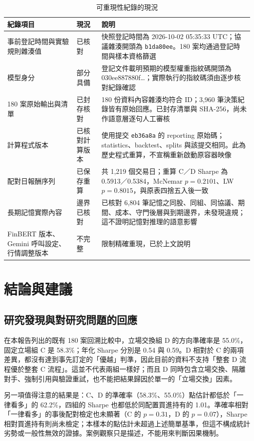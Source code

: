\documentclass[12pt,a4paper]{article}
\numberwithin{table}{section}
\numberwithin{figure}{section}
\begin{document}
\begin{table}[H]
\centering\small
\caption{可重現性紀錄的現況}
\label{tab:prov}
\begin{tabularx}{\textwidth}{@{}L{.25} L{.15} Y@{}}
\toprule
紀錄項目 & 現況 & 說明 \\
\midrule
事前登記時間與實驗規則雜湊值 & 已核對 & 快照登記時間為 2026-10-02 05:35:33 UTC；協議雜湊開頭為 \texttt{b1da80ee}。180 案均通過登記時間與樣本資格篩選 \\
模型身分 & 部分具備 & 登記文件載明預期的模型權重指紋碼開頭為 030ee887880f…；實際執行的指紋碼須由逐步核對紀錄確認 \\
180 案原始輸出與清單 & 已封存核對 & 180 份資料內容雜湊均符合 ID；3,960 筆決策紀錄皆有原始回應。已封存清單與 SHA-256，尚未作語意層逐句人工審核 \\
計算程式版本 & 已核對計算版本 & 使用提交 \texttt{eb36a8a} 的 reporting 原始碼；statistics、backtest、splits 與該提交相同。此為歷史程式重算，不宣稱重新啟動原容器映像 \\
配對日報酬序列 & 已保存重算 & 共 1,219 個交易日；重算 C／D Sharpe 為 0.5913／0.5384，McNemar $p=0.2101$、LW $p=0.8015$，與原表四捨五入後一致 \\
長期記憶實際內容 & 邊界已核對 & 已核對 6,804 筆記憶之同股、同組、同協議、期間、成本、守門後層與到期邊界，未發現違規；這不證明記憶對推理的語意影響 \\
FinBERT 版本、Gemini 呼叫設定、行情調整版本 & 不完整 & 限制精確重現，已於上文說明 \\
\bottomrule
\end{tabularx}
\end{table}


\clearpage\section{結論與建議}

\subsection{研究發現與對研究問題的回應}

在本報告列出的既有 180 案回溯比較中，立場交換組 D 的方向準確率是 55.0\%，固定立場組 C 是 58.3\%；年化 Sharpe 分別是 0.54 與 0.59。D 相對於 C 的兩項差異，都沒有達到事先訂定的「優越」判準，因此目前的資料不支持「整套 D 流程優於整套 C 流程」。這並不代表兩組一樣好；而且 D 同時包含立場交換、隔離對手、強制引用與驗證重試，也不能把結果歸因於單一的「立場交換」因素。

另一項值得注意的結果是：C、D 的準確率（58.3\%、55.0\%）點估計都低於「一律看多」的 62.2\%，四組的 Sharpe 也都低於同配置買進持有的 1.01。準確率相對「一律看多」的事後配對檢定也未顯著（C 的 $p=0.31$，D 的 $p=0.07$），Sharpe 相對買進持有則尚未檢定；本樣本的點估計未超過上述簡單基準，但這不構成統計劣勢或一般性無效的證據。案例觀察只是描述，不能用來判斷因果機制。
\end{document}
